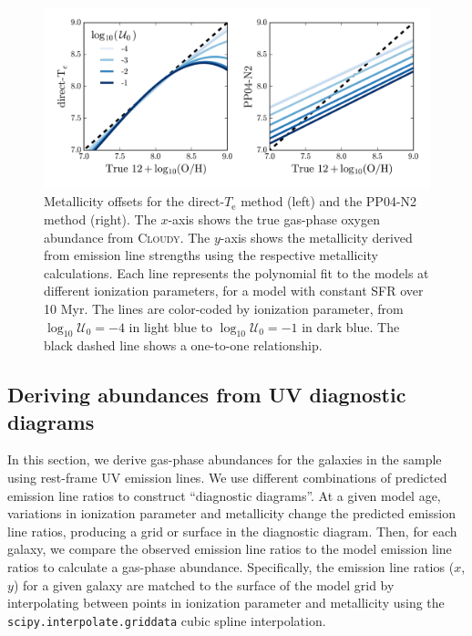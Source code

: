 \documentclass[preprint2]{aastex62}
\newcommand{\Cloudy}{\textsc{Cloudy}\xspace}
\newcommand{\logten}{\ensuremath{\log_{10}}}
\newcommand{\logUeq}[1]{\ensuremath{\logten \mathcal{U}_0 = #1}}
\newcommand{\Te}{\ensuremath{T_{\mathrm{e}}}\xspace}
\begin{document}
\begin{figure}
  \begin{center}
    \includegraphics[width=\linewidth]{figs/f2.png}
    \caption{Metallicity offsets for the direct-\Te method (left) and the PP04-N2 method (right). The $x$-axis shows the true gas-phase oxygen abundance from \Cloudy. The $y$-axis shows the metallicity derived from emission line strengths using the respective metallicity calculations. Each line represents the polynomial fit to the models at different ionization parameters, for a model with constant SFR over 10 Myr. The lines are color-coded by ionization parameter, from \logUeq{-4} in light blue to \logUeq{-1} in dark blue. The black dashed line shows a one-to-one relationship.}
    \label{fig:offset}
  \end{center}
\end{figure}

\subsection{Deriving abundances from UV diagnostic diagrams}\label{sec:Z:UV}

In this section, we derive gas-phase abundances for the galaxies in the sample using rest-frame UV emission lines. We use different combinations of predicted emission line ratios to construct ``diagnostic diagrams''. At a given model age, variations in ionization parameter and metallicity change the predicted emission line ratios, producing a grid or surface in the diagnostic diagram. Then, for each galaxy, we compare the observed emission line ratios to the model emission line ratios to calculate a gas-phase abundance. Specifically, the emission line ratios ($x$, $y$) for a given galaxy are matched to the surface of the model grid by interpolating between points in ionization parameter and metallicity using the {\tt scipy.interpolate.griddata} cubic spline interpolation.
\end{document}
